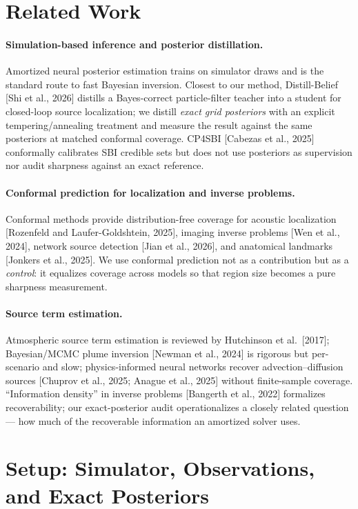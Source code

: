 \documentclass{article}
\begin{document}
\section{Related Work}

\paragraph{Simulation-based inference and posterior distillation.} Amortized neural
posterior estimation trains on simulator draws and is the standard route to fast Bayesian
inversion. Closest to our method, Distill-Belief [Shi et al., 2026] distills a
Bayes-correct particle-filter teacher into a student for closed-loop source localization;
we distill \emph{exact grid posteriors} with an explicit tempering/annealing treatment and
measure the result against the same posteriors at matched conformal coverage. CP4SBI
[Cabezas et al., 2025] conformally calibrates SBI credible sets but does not use
posteriors as supervision nor audit sharpness against an exact reference.

\paragraph{Conformal prediction for localization and inverse problems.} Conformal methods
provide distribution-free coverage for acoustic localization [Rozenfeld and
Laufer-Goldshtein, 2025], imaging inverse problems [Wen et al., 2024], network source
detection [Jian et al., 2026], and anatomical landmarks [Jonkers et al., 2025]. We use
conformal prediction not as a contribution but as a \emph{control}: it equalizes coverage
across models so that region size becomes a pure sharpness measurement.

\paragraph{Source term estimation.} Atmospheric source term estimation is reviewed by
Hutchinson et al.\ [2017]; Bayesian/MCMC plume inversion [Newman et al., 2024] is
rigorous but per-scenario and slow; physics-informed neural networks recover
advection--diffusion sources [Chuprov et al., 2025; Anague et al., 2025] without
finite-sample coverage. ``Information density'' in inverse problems [Bangerth et al.,
2022] formalizes recoverability; our exact-posterior audit operationalizes a closely
related question --- how much of the recoverable information an amortized solver uses.

\section{Setup: Simulator, Observations, and Exact Posteriors}
\label{sec:setup}
\end{document}

